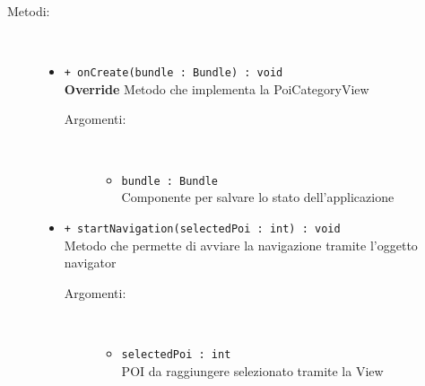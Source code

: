 \documentclass[../DefinizioneDiProdotto.tex]{subfiles}
\begin{document}
\begin{description}
\begin{itemize}
	\end{itemize}
	\item[Metodi:] \
	\begin{itemize}
		\item \texttt{+ onCreate(bundle : Bundle) : void}\\
		\textbf{Override} Metodo che implementa la PoiCategoryView
		\begin{description}
			\item[Argomenti:] \
			\begin{itemize}
				\item \texttt{bundle : Bundle}\\
				Componente per salvare lo stato dell'applicazione\end{itemize}
		\end{description}
		\item \texttt{+ startNavigation(selectedPoi : int) : void}\\
		Metodo che permette di avviare la navigazione tramite l'oggetto navigator
		\begin{description}
			\item[Argomenti:] \
			\begin{itemize}
				\item \texttt{selectedPoi : int}\\
				POI da raggiungere selezionato tramite la View\end{itemize}
		\end{description}
	\end{itemize}
\end{description}
\end{document}
